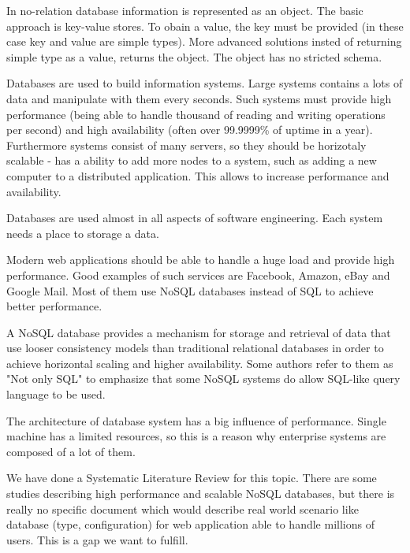 \documentclass[times, 10pt,twocolumn]{article}
\begin{document}
In no-relation database information is represented as an object.
The basic approach is key-value stores. To obain a value, the key must be
provided (in these case key and value are simple types). More
advanced solutions insted of returning simple type as a value, returns 
the object. The object has no stricted schema.

Databases are used to build information systems. Large systems contains a lots of data and manipulate with them
every seconds. Such systems must provide high performance (being able to handle thousand of reading and writing operations
per second) and high availability (often over 99.9999\% of uptime in a year). Furthermore systems consist of many servers, so 
they should be horizotaly scalable - has a ability to add more nodes to a system, such as adding a new computer to a distributed 
application. This allows to increase performance and availability.


Databases are used almost in all aspects of software engineering. Each 
system needs a place to storage a data. 

Modern web applications should be able to handle a huge load and provide high performance. 
Good examples of such services are Facebook, Amazon, eBay and Google Mail. Most of them use NoSQL databases
instead of SQL to achieve better performance.

A NoSQL database provides a mechanism for storage and retrieval of data that use looser consistency models 
than traditional relational databases in order to achieve horizontal scaling and higher availability. Some authors 
refer to them as "Not only SQL" to emphasize that some NoSQL systems do allow SQL-like query language to be used.

The architecture of database system has a big influence of performance. Single machine has a limited
resources, so this is a reason why enterprise systems are composed of a lot of them.

We have done a Systematic Literature Review for this topic. There are some studies describing high performance 
and scalable NoSQL databases, but there is really no specific document which would describe real world scenario like 
database (type, configuration) for web application able to handle millions of users. This is a gap we want to fulfill.

\end{document}

